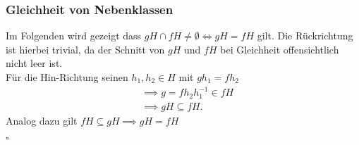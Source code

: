 \documentclass[12pt, german]{article}
\newcommand{\bewiesen}{
	
	\begin{flushright}
		$\square$  \\
\end{flushright}}
\begin{document}
	\subsubsection{Gleichheit von Nebenklassen}
	Im Folgenden wird gezeigt dass $gH \cap fH \not = \emptyset \iff gH = fH$ gilt.
	Die Rückrichtung ist hierbei trivial, da der Schnitt von $gH$ und $fH$ bei Gleichheit offensichtlich nicht leer ist. \\
	
	Für die Hin-Richtung seinen $h_1, h_2 \in H$ mit $gh_1 = fh_2$
	\begin{align*}
		&\implies g=fh_2h_1^{-1} \in fH \\
		&\implies gH \subseteq fH. 
	\end{align*}
	Analog dazu gilt $fH \subseteq gH \implies gH = fH$
	\bewiesen
	
\end{document}
